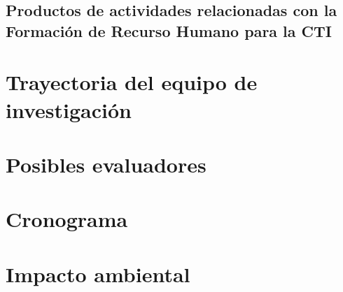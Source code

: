 \documentclass[12pt]{article}
\begin{document}
\subsection{Productos de actividades relacionadas con la Formación de Recurso
Humano para la CTI }



\section{Trayectoria del equipo de investigaci\'on}


\section{Posibles evaluadores}

\section{Cronograma}

\section{Impacto ambiental}
\end{document}
